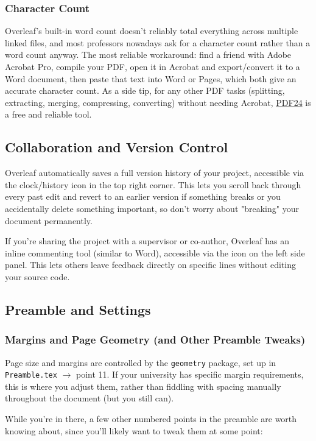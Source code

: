 \subsubsection*{Character Count}
Overleaf's built-in word count doesn't reliably total everything across multiple linked files, and most professors nowadays ask for a character count rather than a word count anyway. The most reliable workaround: find a friend with Adobe Acrobat Pro, compile your PDF, open it in Acrobat and export/convert it to a Word document, then paste that text into Word or Pages, which both give an accurate character count. As a side tip, for any other PDF tasks (splitting, extracting, merging, compressing, converting) without needing Acrobat, \href{https://pdf24.org}{PDF24} is a free and reliable tool.

\subsection*{Collaboration and Version Control}

Overleaf automatically saves a full version history of your project, accessible via the clock/history icon in the top right corner. This lets you scroll back through every past edit and revert to an earlier version if something breaks or you accidentally delete something important, so don't worry about "breaking" your document permanently.

If you're sharing the project with a supervisor or co-author, Overleaf has an inline commenting tool (similar to Word), accessible via the icon on the left side panel. This lets others leave feedback directly on specific lines without editing your source code.

\subsection*{Preamble and Settings}

\subsubsection*{Margins and Page Geometry (and Other Preamble Tweaks)}
Page size and margins are controlled by the \texttt{geometry} package, set up in \texttt{Preamble.tex} $\rightarrow$ point 11. If your university has specific margin requirements, this is where you adjust them, rather than fiddling with spacing manually throughout the document (but you still can).

While you're in there, a few other numbered points in the preamble are worth knowing about, since you'll likely want to tweak them at some point:

